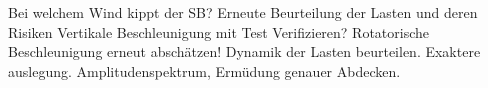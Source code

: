 Bei welchem Wind kippt der SB?
Erneute Beurteilung der Lasten und deren Risiken
Vertikale Beschleunigung mit Test Verifizieren?
Rotatorische Beschleunigung erneut abschätzen!
Dynamik der Lasten beurteilen. Exaktere auslegung. Amplitudenspektrum, Ermüdung genauer Abdecken.
